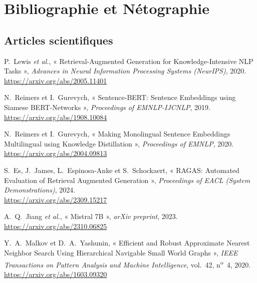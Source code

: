 \chapter*{Bibliographie et Nétographie}

\section*{Articles scientifiques}

\begin{enumerate}[label={[\arabic*]},leftmargin=2.2em]

\item P.~Lewis \emph{et al.}, « Retrieval-Augmented Generation for
Knowledge-Intensive NLP Tasks », \emph{Advances in Neural Information Processing
Systems (NeurIPS)}, 2020. \\
\url{https://arxiv.org/abs/2005.11401}

\item N.~Reimers et I.~Gurevych, « Sentence-BERT: Sentence Embeddings using
Siamese BERT-Networks », \emph{Proceedings of EMNLP-IJCNLP}, 2019. \\
\url{https://arxiv.org/abs/1908.10084}

\item N.~Reimers et I.~Gurevych, « Making Monolingual Sentence Embeddings
Multilingual using Knowledge Distillation », \emph{Proceedings of EMNLP}, 2020. \\
\url{https://arxiv.org/abs/2004.09813}

\item S.~Es, J.~James, L.~Espinosa-Anke et S.~Schockaert, « RAGAS: Automated
Evaluation of Retrieval Augmented Generation », \emph{Proceedings of EACL
(System Demonstrations)}, 2024. \\
\url{https://arxiv.org/abs/2309.15217}

\item A.~Q.~Jiang \emph{et al.}, « Mistral 7B », \emph{arXiv preprint}, 2023. \\
\url{https://arxiv.org/abs/2310.06825}

\item Y.~A.~Malkov et D.~A.~Yashunin, « Efficient and Robust Approximate Nearest
Neighbor Search Using Hierarchical Navigable Small World Graphs », \emph{IEEE
Transactions on Pattern Analysis and Machine Intelligence}, vol.~42, n\textsuperscript{o}~4,
2020. \\
\url{https://arxiv.org/abs/1603.09320}


\end{enumerate}
